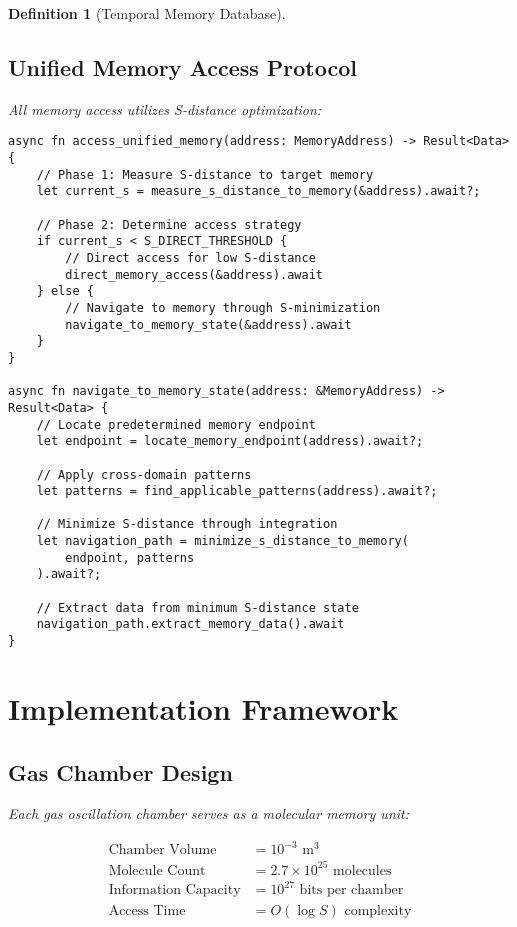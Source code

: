 \documentclass[12pt]{article}
\newtheorem{definition}[theorem]{Definition}
\begin{document}
\begin{definition}[Temporal Memory Database]
\subsection{Unified Memory Access Protocol}

All memory access utilizes S-distance optimization:

\begin{lstlisting}[caption=S-Optimized Memory Access]
async fn access_unified_memory(address: MemoryAddress) -> Result<Data> {
    // Phase 1: Measure S-distance to target memory
    let current_s = measure_s_distance_to_memory(&address).await?;
    
    // Phase 2: Determine access strategy
    if current_s < S_DIRECT_THRESHOLD {
        // Direct access for low S-distance
        direct_memory_access(&address).await
    } else {
        // Navigate to memory through S-minimization
        navigate_to_memory_state(&address).await
    }
}

async fn navigate_to_memory_state(address: &MemoryAddress) -> Result<Data> {
    // Locate predetermined memory endpoint
    let endpoint = locate_memory_endpoint(address).await?;
    
    // Apply cross-domain patterns
    let patterns = find_applicable_patterns(address).await?;
    
    // Minimize S-distance through integration
    let navigation_path = minimize_s_distance_to_memory(
        endpoint, patterns
    ).await?;
    
    // Extract data from minimum S-distance state
    navigation_path.extract_memory_data().await
}
\end{lstlisting}

\section{Implementation Framework}

\subsection{Gas Chamber Design}

Each gas oscillation chamber serves as a molecular memory unit:

\begin{align}
\text{Chamber Volume} &= 10^{-3} \text{ m}^3 \\
\text{Molecule Count} &= 2.7 \times 10^{25} \text{ molecules} \\
\text{Information Capacity} &= 10^{27} \text{ bits per chamber} \\
\text{Access Time} &= O(\log S) \text{ complexity}
\end{align}


\end{definition}
\end{document}
